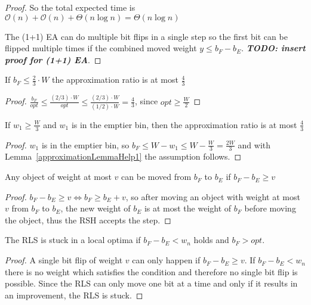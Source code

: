 \begin{proof}
    So the total expected time is $\mathcal{O}(n) + \mathcal{O}(n) + \Theta(n\log{}n) = \Theta(n\log{}n)$

    The (1+1) EA can do multiple bit flips in a single step so the first bit can be flipped multiple times if the combined moved weight \(y \le b_F-b_E\). \textbf{\textit{TODO: insert proof for (1+1) EA}}.
\end{proof}

\begin{lemma}\label{approximationLemmaHelp1}
    If \(b_F \le \frac{2}{3} \cdot W\) the approximation ratio is at most $\frac{4}{3}$
\end{lemma}
\begin{proof}
    \(\frac{b_F}{opt} \le \frac{(2/3) \cdot W}{opt} \le \frac{(2/3) \cdot W}{(1/2) \cdot W} = \frac{4}{3}\), since \(opt \ge \frac{W}{2}\)
\end{proof}

\begin{corollary}\label{approximationCorollaryHelp2}
    If \(w_1 \ge \frac{W}{3}\) and \(w_1\) is in the emptier bin, then the approximation ratio is at most $\frac{4}{3}$
\end{corollary}
\begin{proof}
    $w_1$ is in the emptier bin, so \( b_F \le W - w_1 \le W - \frac{W}{3} = \frac{2W}{3} \) and with Lemma~\ref{approximationLemmaHelp1} the assumption follows.
\end{proof}

\begin{lemma}\label{movingObjectsLemma}
    Any object of weight at most $v$ can be moved from $b_F$ to $b_E$ if \(b_F - b_E \ge v\)
\end{lemma}
\begin{proof}
    \(b_F - b_E \ge v \Leftrightarrow b_F \ge b_E + v\), so after moving an object with weight at most $v$ from $b_F$ to $b_E$, the new weight of $b_E$ is at most the weight of $b_F$ before moving the object, thus the RSH accepts the step.
\end{proof}

\begin{corollary}
    The RLS is stuck in a local optima if \(b_F-b_E < w_n\) holds and \(b_F > opt\).
\end{corollary}
\begin{proof}
    A single bit flip of weight $v$ can only happen if \(b_F - b_E \ge v\). If \(b_F-b_E < w_n\) there is no weight which satisfies the condition and therefore no single bit flip is possible. Since the RLS can only move one bit at a time and only if it results in an improvement, the RLS is stuck.
\end{proof}

